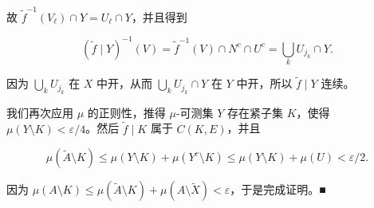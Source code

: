 \begin{theorem}
\begin{subitems}
故 $ \widetilde{f}^{-1}(V_\ell) \cap Y = U_\ell \cap Y $，并且得到

\[
(\widetilde{f} \mid Y)^{-1}(V) = \widetilde{f}^{-1}(V) \cap N^c \cap U^c = \bigcup_k U_{j_k} \cap Y .
\]

因为 $ \bigcup_k U_{j_k} $ 在 $ X $ 中开，从而 $ \bigcup_k U_{j_k} \cap Y $ 在 $ Y $ 中开，所以 $ \widetilde{f} \mid Y $ 连续。

\item

我们再次应用 $ \mu $ 的正则性，推得 $ \mu $-可测集 $ Y $ 存在紧子集 $ K $，使得 $ \mu(Y \setminus K) < \varepsilon/4 $。然后
$ \widetilde{f} \mid K $ 属于 $ C(K,E) $，并且

\[
\mu(\widetilde{A}\setminus K) \le \mu(Y\setminus K) + \mu(Y^{c}\setminus K) \le \mu(Y\setminus K) + \mu(U) < \varepsilon/2 .
\]

因为 $ \mu(A\setminus K) \le \mu(\widetilde{A}\setminus K) + \mu(A\setminus\widetilde{X}) < \varepsilon $，于是完成证明。\nobreak\hspace{0.35em}■

\end{subitems}

\end{theorem}

\exerciseshead

